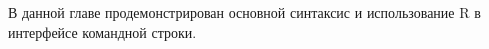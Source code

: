 В данной главе продемонстрирован основной синтаксис и использование R в интерфейсе 
командной строки. 

